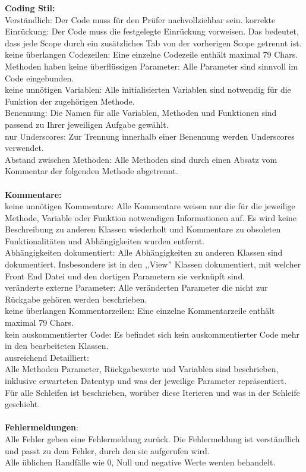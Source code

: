 \documentclass[accentcolor=tud0b,12pt,paper=a4]{tudreport}
\begin{document}
\textbf{Coding Stil:}\\
Verständlich: Der Code muss für den Prüfer nachvollziehbar sein.
korrekte Einrückung: Der Code muss die festgelegte Einrückung vorweisen. Das bedeutet, dass jede Scope durch ein zusätzliches Tab von der vorherigen Scope getrennt ist.\\
keine überlangen Codezeilen: Eine einzelne Codezeile enthält maximal 79 Chars.\\
Methoden haben keine überflüssigen Parameter: Alle Parameter sind sinnvoll im Code eingebunden.\\
keine unnötigen Variablen: Alle initialisierten Variablen sind notwendig für die Funktion der zugehörigen Methode.\\
Benennung: Die Namen für alle Variablen, Methoden und Funktionen sind passend zu Ihrer jeweiligen Aufgabe gewählt.\\
nur Underscores: Zur Trennung innerhalb einer Benennung werden Underscores verwendet.\\
Abstand zwischen Methoden: Alle Methoden sind durch einen Absatz vom Kommentar der folgenden Methode abgetrennt.\\
~\\
\textbf{Kommentare:}\\
keine unnötigen Kommentare: Alle Kommentare weisen nur die für die jeweilige Methode, Variable oder Funktion notwendigen Informationen auf. Es wird keine Beschreibung zu anderen Klassen wiederholt und Kommentare zu obsoleten Funktionalitäten und Abhängigkeiten wurden entfernt.\\
Abhängigkeiten dokumentiert: Alle Abhängigkeiten zu anderen Klassen sind dokumentiert. Insbesondere ist in den ,,View'' Klassen dokumentiert, mit welcher Front End Datei und den dortigen Parametern sie verknüpft sind.\\
veränderte externe Parameter: Alle veränderten Parameter die nicht zur Rückgabe gehören werden beschrieben.\\
keine überlangen Kommentarzeilen: Eine einzelne Kommentarzeile enthält maximal 79 Chars.\\
kein auskommentierter Code: Es befindet sich kein auskommentierter Code mehr in den bearbeiteten Klassen.\\

ausreichend Detailliert:\\
Alle Methoden Parameter, Rückgabewerte und Variablen sind beschrieben, inklusive erwarteten Datentyp und was der jeweilige Parameter repräsentiert.\\
Für alle Schleifen ist beschrieben, worüber diese Iterieren und was in der Schleife geschieht.\\
~\\
\textbf{Fehlermeldungen}:\\
Alle Fehler geben eine Fehlermeldung zurück. Die Fehlermeldung ist verständlich und passt zu dem Fehler, durch den sie aufgerufen wird.\\
Alle üblichen Randfälle wie 0, Null und negative Werte werden behandelt.\\

\newpage
\end{document}
